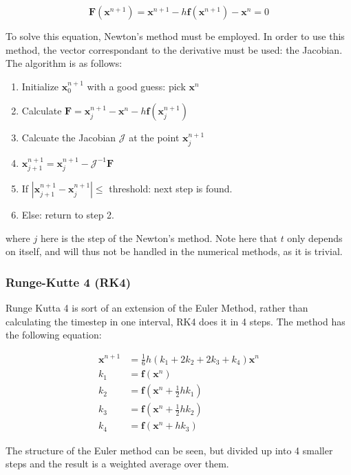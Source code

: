 \begin{equation}
	\mathbf{F}(\mathbf{x}^{n+1}) = \mathbf{x}^{{n+1}} - h \mathbf{f}(\mathbf{x}^{{n+1}}) - \mathbf{x}^n = 0
\end{equation}

To solve this equation, Newton's method must be employed. In order to use this method, the vector correspondant to the derivative must be used: the Jacobian. The algorithm is as follows: 

\begin{enumerate}
	\item Initialize $\textbf{x}^{n+1}_0$ with a good guess: pick $\textbf{x}^n$
	\item Calculate $\textbf{F} = \textbf{x}^{n+1}_{j} - \textbf{x}^{n} - h \textbf{f}(\textbf{x}^{n+1}_{j})$
	\item Calcuate the Jacobian $\mathcal{J}$ at the point $\textbf{x}^{n+1}_{j}$
	\item $\textbf{x}^{n+1}_{j+1} = \textbf{x}^{n+1}_{j} - \mathcal{J}^{-1} \textbf{F}$
	\item If $|\textbf{x}^{n+1}_{j+1} - \textbf{x}^{n+1}_{j}| \le $ threshold: next step is found.
	\item Else: return to step 2.
\end{enumerate}

where $j$ here is the step of the Newton's method. Note here that $t$ only depends on itself, and will thus not be handled in the numerical methods, as it is trivial.  

\subsubsection{Runge-Kutte 4 (RK4)}

Runge Kutta 4 is sort of an extension of the Euler Method, rather than calculating the timestep in one interval, RK4 does it in 4 steps. The method has the following equation:


\begin{align}
	\textbf{x}^{n+1} &= \frac{1}{6}h(k_1 + 2k_2 + 2k_3 + k_4) \textbf{x}^n \\
	k_1 &= \textbf{f}(\textbf{x}^n) \\
	k_2 &= \textbf{f}(\textbf{x}^n + \frac{1}{2}h k_1) \\
	k_3 &= \textbf{f}(\textbf{x}^n + \frac{1}{2}h k_2) \\
	k_4 &= \textbf{f}(\textbf{x}^n + h k_3)
\end{align}

The structure of the Euler method can be seen, but divided up into 4 smaller steps and the result is a weighted average over them. 

